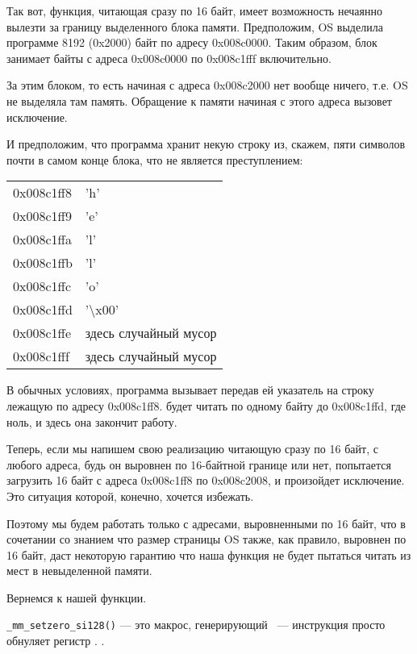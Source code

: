Так вот, функция, читающая сразу по 16 байт, имеет возможность нечаянно вылезти за границу 
выделенного блока памяти. 
Предположим, \ac{OS} выделила программе 8192 (0x2000) байт по адресу 0x008c0000. 
Таким образом, блок занимает байты с адреса 0x008c0000 по 0x008c1fff включительно.

За этим блоком, то есть начиная с адреса 0x008c2000 нет вообще ничего, т.е. \ac{OS} не выделяла там память. 
Обращение к памяти начиная с этого адреса вызовет исключение.

И предположим, что программа хранит некую строку из, скажем, пяти символов почти в самом конце блока, 
что не является преступлением:

\begin{center}
  \begin{tabular}{ | l | l | }
    \hline
        0x008c1ff8 & 'h' \\
        0x008c1ff9 & 'e' \\
        0x008c1ffa & 'l' \\
        0x008c1ffb & 'l' \\
        0x008c1ffc & 'o' \\
        0x008c1ffd & '\textbackslash{}x00' \\
        0x008c1ffe & здесь случайный мусор \\
        0x008c1fff & здесь случайный мусор \\
    \hline
  \end{tabular}
\end{center}

В обычных условиях, программа вызывает \strlen передав ей указатель на строку  
лежащую по адресу 0x008c1ff8. 
\strlen будет читать по одному байту до 0x008c1ffd, где ноль, и здесь она закончит работу.

Теперь, если мы напишем свою реализацию \strlen читающую сразу по 16 байт, с любого адреса, 
будь он выровнен по 16-байтной границе или нет, 
\MOVDQU попытается загрузить 16 байт с адреса 0x008c1ff8 по 0x008c2008, и произойдет исключение. 
Это ситуация которой, конечно, хочется избежать.

Поэтому мы будем работать только с адресами, выровненными по 16 байт, что в сочетании со знанием 
что размер страницы \ac{OS} также, как правило, выровнен по 16 байт, 
даст некоторую гарантию что наша функция не будет пытаться читать из мест в невыделенной памяти.

Вернемся к нашей функции.

\verb|_mm_setzero_si128()| --- это макрос, генерирующий  ~--- инструкция просто обнуляет регистр .
.

